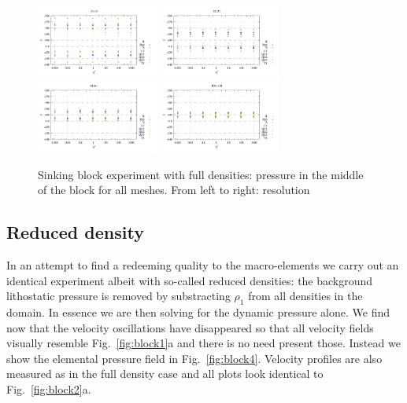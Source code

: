 \documentclass[a4paper,12pt]{article}
\begin{document}
\begin{figure}[t]
\centering
\includegraphics[width=4cm]{../results/exp08/p_block_res16.pdf}
\includegraphics[width=4cm]{../results/exp08/p_block_res32.pdf}
\includegraphics[width=4cm]{../results/exp08/p_block_res64.pdf}
\includegraphics[width=4cm]{../results/exp08/p_block_res128.pdf}
\caption{Sinking block experiment with full densities:  pressure in the middle
of the block for all meshes. From left to right: resolution  \label{fig:block3}}
\end{figure}


\subsection{Reduced density}

In an attempt to find a redeeming quality to the macro-elements 
we carry out an identical experiment albeit with so-called reduced densities:
the background lithostatic pressure is removed by substracting $\rho_1$
from all densities in the domain. In essence we are then solving for the dynamic
pressure alone. 
We find now that the velocity oscillations have disappeared 
so that all velocity fields visually resemble Fig.~\ref{fig:block1}a and 
there is no need present those. Instead we show the elemental pressure field in Fig.~\ref{fig:block4}.
Velocity profiles are also measured as in the full density case and 
all plots look identical to Fig.~\ref{fig:block2}a.
\end{document}
